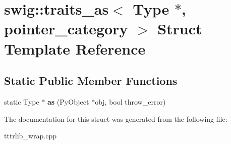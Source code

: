 \hypertarget{structswig_1_1traits__as_3_01_type_01_5_00_01pointer__category_01_4}{}\section{swig\+:\+:traits\+\_\+as$<$ Type $\ast$, pointer\+\_\+category $>$ Struct Template Reference}
\label{structswig_1_1traits__as_3_01_type_01_5_00_01pointer__category_01_4}
\subsection*{Static Public Member Functions}
\begin{DoxyCompactItemize}
\item 
\mbox{\label{structswig_1_1traits__as_3_01_type_01_5_00_01pointer__category_01_4_a7312181fed828608a6a29b4ff622a85f}} 
static Type $\ast$ {\bfseries as} (Py\+Object $\ast$obj, bool throw\+\_\+error)
\end{DoxyCompactItemize}


The documentation for this struct was generated from the following file\+:\begin{DoxyCompactItemize}
\item 
tttrlib\+\_\+wrap.\+cpp\end{DoxyCompactItemize}
